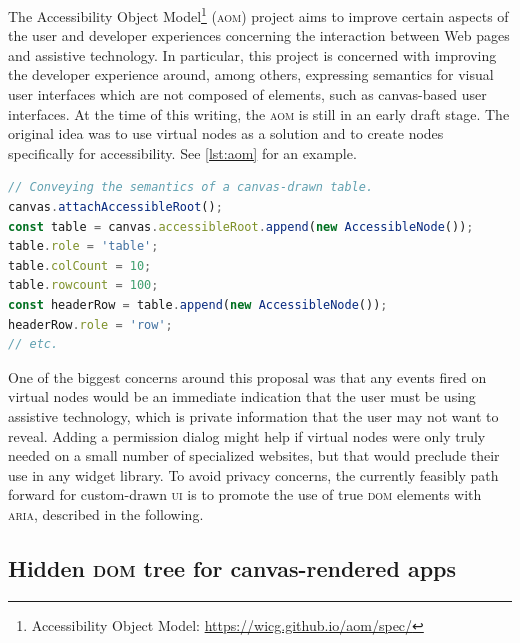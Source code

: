 \documentclass[sigconf]{acmart}
\begin{document}
The Accessibility Object Model\footnote{Accessibility Object Model: \url{https://wicg.github.io/aom/spec/}} (\textsc{aom}) project aims to improve certain aspects of the user and developer experiences concerning the interaction between Web pages and assistive technology. In particular, this project is concerned with improving the developer experience around, among others, expressing semantics for visual user interfaces which are not composed of elements, such as canvas-based user interfaces. At the time of this writing, the \textsc{aom} is still in an early draft stage. The original idea was to use virtual nodes as a solution and to create nodes specifically for accessibility. See \autoref{lst:aom} for an example.

\begin{lstlisting}[language=JavaScript, style=ES6, label={lst:aom}, caption={The now retracted \texttt{AccessibleNode} \textsc{api} of the Accessibility Object Model.}]
// Conveying the semantics of a canvas-drawn table.
canvas.attachAccessibleRoot();
const table = canvas.accessibleRoot.append(new AccessibleNode());
table.role = 'table';
table.colCount = 10;
table.rowcount = 100;
const headerRow = table.append(new AccessibleNode());
headerRow.role = 'row';
// etc. 
\end{lstlisting}

One of the biggest concerns around this proposal was that any events fired on virtual nodes would be an immediate indication that the user must be using assistive technology, which is private information that the user may not want to reveal. Adding a permission dialog might help if virtual nodes were only truly needed on a small number of specialized websites, but that would preclude their use in any widget library. To avoid privacy concerns, the currently feasibly path forward for custom-drawn \textsc{ui} is to promote the use of true \textsc{dom} elements with \textsc{aria}, described in the following.

\subsection{Hidden \textsc{dom} tree for canvas-rendered apps}
\end{document}
